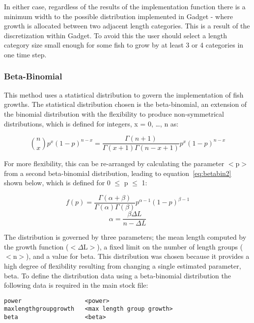 \documentclass [a4paper, 10pt]{book}
\begin{document}
\bigskip
In either case, regardless of the results of the implementation function there is a minimum width to the possible distribution implemented in Gadget - where growth is allocated between two adjacent length categories.  This is a result of the discretization within Gadget.  To avoid this the user should select a length category size small enough for some fish to grow by at least 3 or 4 categories in one time step.

\subsubsection{Beta-Binomial}
This method uses a statistical distribution to govern the implementation of fish growths.  The statistical distribution chosen is the beta-binomial, an extension of the binomial distribution with the flexibility to produce non-symmetrical distributions, which is defined for integers, x = 0, \ldots, n as:

\begin{equation}\label{eq:betabin1}
{n \choose x}p^x (1-p)^{n-x} = \frac{\Gamma(n+1)}{\Gamma(x+1)\Gamma(n-x+1)}p^x(1-p)^{n-x} 
\end{equation}

For more flexibility, this can be re-arranged by calculating the parameter $<$p$>$ from a second beta-binomial distribution, leading to equation~\ref{eq:betabin2} shown below, which is defined for 0 $\le$ p $\le$ 1:

\begin{equation}\label{eq:betabin2}
f(p)=\frac{\Gamma(\alpha+\beta)}{\Gamma(\alpha)\Gamma(\beta)}p^{\alpha-1}(1-p)^{\beta-1}
\end{equation}
\begin{equation}\label{eq:betabin3}
\alpha=\frac{\beta\Delta L}{n-\Delta L}
\end{equation}

The distribution is governed by three parameters; the mean length computed by the growth function ($<$$\Delta$L$>$), a fixed limit on the number of length groups ($<$n$>$), and a value for beta.  This distribution was chosen because it provides a high degree of flexibility resulting from changing a single estimated parameter, beta.  To define the distribution data using a beta-binomial distribution the following data is required in the main stock file:

\begin{verbatim}
power                  <power>
maxlengthgroupgrowth   <max length group growth>
beta                   <beta>
\end{verbatim}
\end{document}
